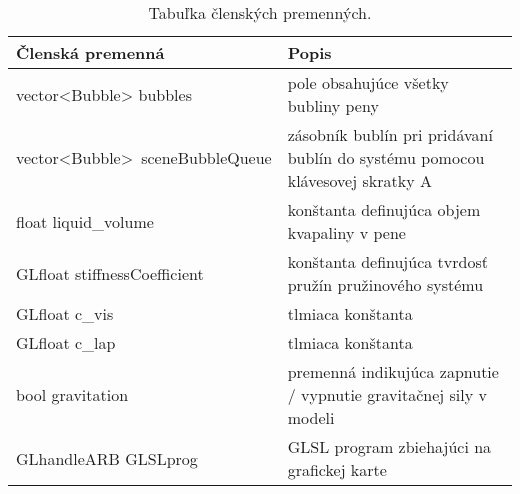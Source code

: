 \begin{table}[H]
	\centering
	\caption{Tabuľka členských premenných.}
	\setlength{\extrarowheight}{2pt}
	\begin{tabularx}{\textwidth}{|X|X|}
		\hline
		\textbf{Členská premenná}               & \textbf{Popis}                                                                          \\ \hline
		vector<Bubble> bubbles          & pole obsahujúce všetky bubliny peny                                            \\ \hline
		\mbox{vector<Bubble> sceneBubbleQueue} & zásobník bublín pri pridávaní bublín do systému pomocou klávesovej skratky A \\ \hline
		float liquid\_volume                    & konštanta definujúca objem kvapaliny v pene                                    \\ \hline
		GLfloat stiffnessCoefficient            & konštanta definujúca tvrdosť pružín pružinového systému                        \\ \hline
		GLfloat c\_vis                          & tlmiaca konštanta                                                              \\ \hline
		GLfloat c\_lap                          & tlmiaca konštanta                                                              \\ \hline
		bool gravitation                        & premenná indikujúca zapnutie / vypnutie gravitačnej sily v modeli              \\ \hline
		GLhandleARB GLSLprog                    & GLSL program zbiehajúci na grafickej karte \\ \hline
	\end{tabularx}
\end{table}

